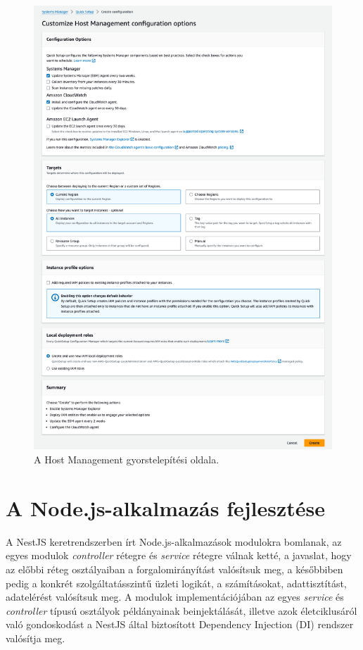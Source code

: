 \begin{figure}[ht]
  \centering
  \includegraphics[width=152mm, keepaspectratio]{figures/hostmgmt.png}
  \caption{A Host Management gyorstelepítési oldala.}
  \label{fig:hostmgmt}
\end{figure}

\section{A Node.js-alkalmazás fejlesztése}

A NestJS keretrendszerben írt Node.js-alkalmazások modulokra bomlanak, az egyes modulok \emph{controller} rétegre és \emph{service} rétegre válnak ketté, a javaslat, hogy az előbbi réteg osztályaiban a forgalomirányítást valósítsuk meg, a későbbiben pedig a konkrét szolgáltatásszintű üzleti logikát, a számításokat, adattisztítást, adatelérést valósítsuk meg. A modulok implementációjában az egyes \emph{service} és \emph{controller} típusú osztályok példányainak beinjektálását, illetve azok életciklusáról való gondoskodást a NestJS által biztosított Dependency Injection (DI) rendszer valósítja meg.


